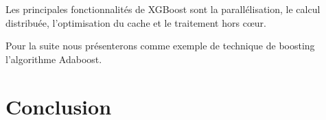 \documentclass[french,a4paper,12pt]{article}
\begin{document}
\quad Les principales fonctionnalités de XGBoost sont la parallélisation, le calcul distribuée, l'optimisation du cache et le traitement hors cœur.

\quad Pour la suite nous présenterons comme exemple de technique de boosting l'algorithme Adaboost.



























\newpage
\section{Conclusion}






\newpage
\begin{center}
\listoffigures
\end{center}

\newpage

\begin{center}


\end{center}
\end{document}
